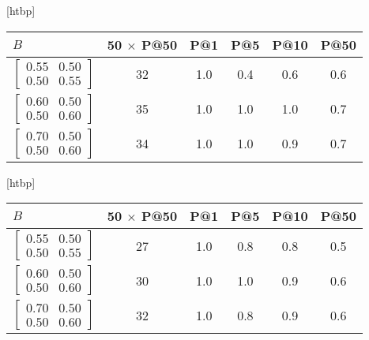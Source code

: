 \documentclass{tufte-handout}
\makeatletter
\renewenvironment{table}[1][htbp]{%
\@tufte@orig@float{table}[#1]}{%
\@tufte@orig@endfloat}%
\makeatother
\begin{document}
\begin{table}[htbp]
  \begin{tabular}{l c c c c c}
    $B$ & 50 $\times$ P@50 & P@1 & P@5 & P@10 & P@50 \\ \toprule
  $\begin{bmatrix} 0.55 & 0.50 \\0.50 &0.55 \end{bmatrix}$ & 32 & 1.0 & 0.4 & 0.6 & 0.6 \\
  $\begin{bmatrix} 0.60 & 0.50 \\0.50 &0.60 \end{bmatrix}$ & 35 & 1.0 & 1.0 & 1.0 & 0.7 \\
  $\begin{bmatrix} 0.70 & 0.50 \\0.50 &0.60 \end{bmatrix}$ & 34 & 1.0 & 1.0 & 0.9 & 0.7 \\
  \end{tabular}
  \caption{Performance vs B Matrix. MAD Algorithm. Seed=1234, Directed, Training Size=20}
  \label{tab:perf-vs-b-5}
\end{table}

\begin{table}[htbp]
  \begin{tabular}{l c c c c c}
    $B$ & 50 $\times$ P@50 & P@1 & P@5 & P@10 & P@50 \\ \toprule
  $\begin{bmatrix} 0.55 & 0.50 \\0.50 &0.55 \end{bmatrix}$ & 27 & 1.0 & 0.8 & 0.8 & 0.5 \\
  $\begin{bmatrix} 0.60 & 0.50 \\0.50 &0.60 \end{bmatrix}$ & 30 & 1.0 & 1.0 & 0.9 & 0.6 \\
  $\begin{bmatrix} 0.70 & 0.50 \\0.50 &0.60 \end{bmatrix}$ & 32 & 1.0 & 0.8 & 0.9 & 0.6 \\
  \end{tabular}
  \caption{Performance vs B Matrix. MAD Algorithm. Seed=0, Undirected, Training Size=20}
  \label{tab:perf-vs-b-6}
\end{table}
\end{document}
